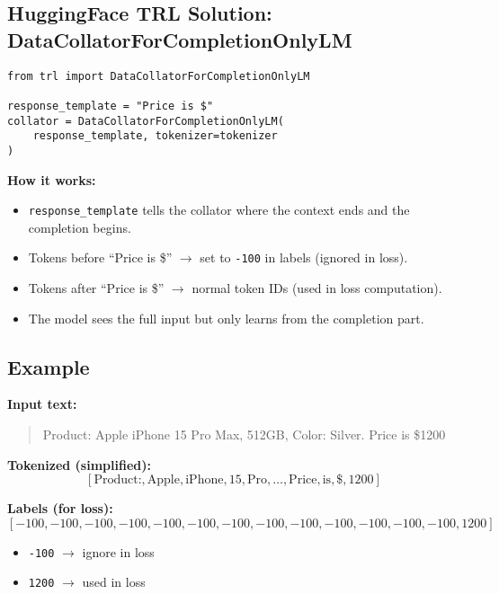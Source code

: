\subsection{HuggingFace TRL Solution: DataCollatorForCompletionOnlyLM}

\begin{tcolorbox}[colback=blue!5!white,colframe=blue!75!black,title=Usage]
\begin{verbatim}
from trl import DataCollatorForCompletionOnlyLM

response_template = "Price is $"
collator = DataCollatorForCompletionOnlyLM(
    response_template, tokenizer=tokenizer
)
\end{verbatim}
\end{tcolorbox}

\textbf{How it works:}
\begin{itemize}
    \item \texttt{response\_template} tells the collator where the context ends and the completion begins.
    \item Tokens before ``Price is \$'' $\rightarrow$ set to \texttt{-100} in labels (ignored in loss).
    \item Tokens after ``Price is \$'' $\rightarrow$ normal token IDs (used in loss computation).
    \item The model sees the full input but only learns from the completion part.
\end{itemize}

\subsection{Example}

\textbf{Input text:}  
\begin{quote}
Product: Apple iPhone 15 Pro Max, 512GB, Color: Silver. Price is \$1200
\end{quote}

\textbf{Tokenized (simplified):}  
\[
[\text{Product:}, \text{Apple}, \text{iPhone}, 15, \text{Pro}, \dots, \text{Price}, \text{is}, \$, 1200]
\]

\textbf{Labels (for loss):}  
\[
[-100, -100, -100, -100, -100, -100, -100, -100, -100, -100, -100, -100, -100, 1200]
\]

\begin{itemize}
    \item \texttt{-100} $\rightarrow$ ignore in loss
    \item \texttt{1200} $\rightarrow$ used in loss
\end{itemize}

